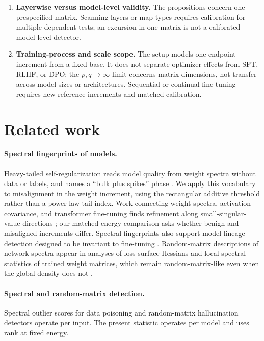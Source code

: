 \documentclass[11pt]{article}
\theoremstyle{definition}
\theoremstyle{remark}
\begin{document}
\begin{enumerate}[leftmargin=1.6em,itemsep=3pt]
\item \textbf{Layerwise versus model-level validity.} The propositions concern
one prespecified matrix. Scanning layers or map types requires calibration for
multiple dependent tests; an excursion in one matrix is not a calibrated
model-level detector.
\item \textbf{Training-process and scale scope.} The setup models one endpoint
increment from a fixed base. It does not separate optimizer effects from SFT,
RLHF, or DPO; the $p,q\to\infty$ limit concerns matrix dimensions, not transfer
across model sizes or architectures. Sequential or continual fine-tuning requires
new reference increments and matched calibration.
\end{enumerate}

\section{Related work}
\label{sec:related}

\paragraph{Spectral fingerprints of models.} Heavy-tailed self-regularization reads model
quality from weight spectra without data or labels, and names a ``bulk plus spikes'' phase
\cite{martin2021}. We apply this vocabulary to misalignment in the weight increment, using
the rectangular additive threshold rather than a power-law tail index. Work connecting
weight spectra, activation covariance, and transformer fine-tuning finds refinement along
small-singular-value directions \cite{staats2024}; our matched-energy comparison asks
whether benign and misaligned increments differ. Spectral fingerprints also support model
lineage detection designed to be invariant to fine-tuning \cite{ghost2026}. Random-matrix
descriptions of network spectra appear in analyses of loss-surface Hessians
\cite{pennington2017} and local spectral statistics of trained weight matrices, which remain
random-matrix-like even when the global density does not \cite{thamm2022}.

\paragraph{Spectral and random-matrix detection.} Spectral outlier scores for
data poisoning \cite{tran2018} and random-matrix hallucination detectors
\cite{ettori2026} operate per input. The present statistic operates per model and
uses rank at fixed energy.
\end{document}

